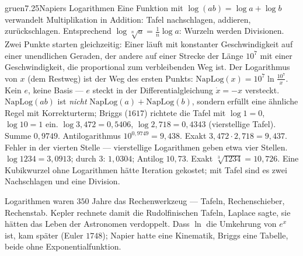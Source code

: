 \begin{loesungkarte}{gruen}{7.25}{Napiers Logarithmen}
Eine Funktion mit $\log(ab) = \log a + \log b$ verwandelt Multiplikation in Addition: Tafel nachschlagen, addieren, zurückschlagen. Entsprechend $\log\sqrt[n]a = \frac1n\log a$: Wurzeln werden Divisionen.
Zwei Punkte starten gleichzeitig: Einer läuft mit konstanter Geschwindigkeit auf einer unendlichen Geraden, der andere auf einer Strecke der Länge $10^{7}$ mit einer Geschwindigkeit, die proportional zum verbleibenden Weg ist. Der Logarithmus von $x$ (dem Restweg) ist der Weg des ersten Punkts: $\mathrm{NapLog}(x) = 10^{7}\ln\frac{10^{7}}x$. Kein $e$, keine Basis --- $e$ steckt in der Differentialgleichung $\dot x = -x$ versteckt. $\mathrm{NapLog}(ab)$ ist \emph{nicht} $\mathrm{NapLog}(a) + \mathrm{NapLog}(b)$, sondern erfüllt eine ähnliche Regel mit Korrekturterm; Briggs ($1617$) richtete die Tafel mit $\log1 = 0$, $\log10 = 1$ ein.
$\log3{,}472 = 0{,}5406$, $\log2{,}718 = 0{,}4343$ (vierstellige Tafel). Summe $0{,}9749$. Antilogarithmus $10^{0{,}9749} = 9{,}438$. Exakt $3{,}472\cdot2{,}718 = 9{,}437$. Fehler in der vierten Stelle --- vierstellige Logarithmen geben etwa vier Stellen.
$\log1234 = 3{,}0913$; durch $3$: $1{,}0304$; Antilog $10{,}73$. Exakt $\sqrt[3]{1234} = 10{,}726$. Eine Kubikwurzel ohne Logarithmen hätte Iteration gekostet; mit Tafel sind es zwei Nachschlagen und eine Division.
\begin{mitnehmen}\kastentext
Logarithmen waren $350$ Jahre das Rechenwerkzeug --- Tafeln, Rechenschieber, Rechenstab. Kepler rechnete damit die Rudolfinischen Tafeln, Laplace sagte, sie hätten das Leben der Astronomen verdoppelt. Dass $\ln$ die Umkehrung von $e^{x}$ ist, kam später (Euler $1748$); Napier hatte eine Kinematik, Briggs eine Tabelle, beide ohne Exponentialfunktion.
\end{mitnehmen}
\end{loesungkarte}

